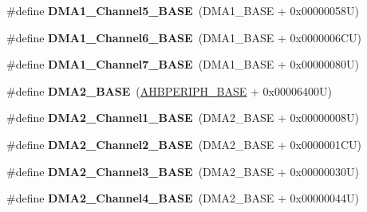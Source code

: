 \begin{DoxyCompactItemize}
\item 
\hypertarget{group___peripheral__memory__map_gac041a71cd6c1973964f847a68aa14478}{\#define {\bfseries D\-M\-A1\-\_\-\-Channel5\-\_\-\-B\-A\-S\-E}~(D\-M\-A1\-\_\-\-B\-A\-S\-E + 0x00000058\-U)}\label{group___peripheral__memory__map_gac041a71cd6c1973964f847a68aa14478}

\item 
\hypertarget{group___peripheral__memory__map_ga896c2c7585dd8bc3969cf8561f689d2d}{\#define {\bfseries D\-M\-A1\-\_\-\-Channel6\-\_\-\-B\-A\-S\-E}~(D\-M\-A1\-\_\-\-B\-A\-S\-E + 0x0000006\-C\-U)}\label{group___peripheral__memory__map_ga896c2c7585dd8bc3969cf8561f689d2d}

\item 
\hypertarget{group___peripheral__memory__map_gaeee0d1f77d0db1db533016a09351166c}{\#define {\bfseries D\-M\-A1\-\_\-\-Channel7\-\_\-\-B\-A\-S\-E}~(D\-M\-A1\-\_\-\-B\-A\-S\-E + 0x00000080\-U)}\label{group___peripheral__memory__map_gaeee0d1f77d0db1db533016a09351166c}

\item 
\hypertarget{group___peripheral__memory__map_gab72a9ae145053ee13d1d491fb5c1df64}{\#define {\bfseries D\-M\-A2\-\_\-\-B\-A\-S\-E}~(\hyperlink{group___peripheral__memory__map_ga92eb5d49730765d2abd0f5b09548f9f5}{A\-H\-B\-P\-E\-R\-I\-P\-H\-\_\-\-B\-A\-S\-E} + 0x00006400\-U)}\label{group___peripheral__memory__map_gab72a9ae145053ee13d1d491fb5c1df64}

\item 
\hypertarget{group___peripheral__memory__map_gad3bd6c4201d12f5d474518c1b02f8e3b}{\#define {\bfseries D\-M\-A2\-\_\-\-Channel1\-\_\-\-B\-A\-S\-E}~(D\-M\-A2\-\_\-\-B\-A\-S\-E + 0x00000008\-U)}\label{group___peripheral__memory__map_gad3bd6c4201d12f5d474518c1b02f8e3b}

\item 
\hypertarget{group___peripheral__memory__map_ga22f39f23c879c699b88e04a629f69d1c}{\#define {\bfseries D\-M\-A2\-\_\-\-Channel2\-\_\-\-B\-A\-S\-E}~(D\-M\-A2\-\_\-\-B\-A\-S\-E + 0x0000001\-C\-U)}\label{group___peripheral__memory__map_ga22f39f23c879c699b88e04a629f69d1c}

\item 
\hypertarget{group___peripheral__memory__map_ga6f2369b8bc155fb55a28891987605c2c}{\#define {\bfseries D\-M\-A2\-\_\-\-Channel3\-\_\-\-B\-A\-S\-E}~(D\-M\-A2\-\_\-\-B\-A\-S\-E + 0x00000030\-U)}\label{group___peripheral__memory__map_ga6f2369b8bc155fb55a28891987605c2c}

\item 
\hypertarget{group___peripheral__memory__map_ga01b063266473f290a55047654fbbfbee}{\#define {\bfseries D\-M\-A2\-\_\-\-Channel4\-\_\-\-B\-A\-S\-E}~(D\-M\-A2\-\_\-\-B\-A\-S\-E + 0x00000044\-U)}\label{group___peripheral__memory__map_ga01b063266473f290a55047654fbbfbee}


\end{DoxyCompactItemize}
